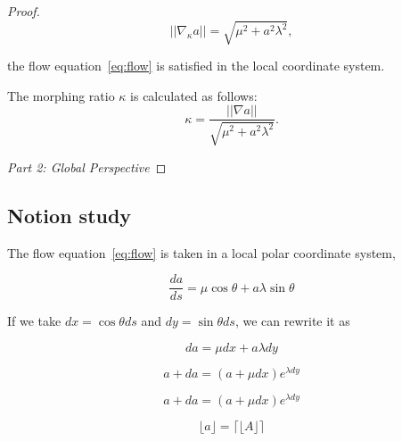 \begin{proof}
    \[ ||\nabla_\kappa a|| = \sqrt{\mu^2 + a^2 \lambda^2}, \]

    the flow equation~\eqref{eq:flow} is satisfied in the local coordinate system.

    The morphing ratio \( \kappa \) is calculated as follows:
    \begin{equation}
        \kappa = \frac{||\nabla a||}{\sqrt{\mu^2 + a^2 \lambda^2}}\label{eq:ratio}.
    \end{equation}

    \emph{Part 2: Global Perspective}



    \qedhere
\end{proof}

\subsection{Notion study}\label{subsec:notion-study}

The flow equation~\eqref{eq:flow} is taken in a local polar coordinate system,

$$\frac{da}{ds} = \mu \cos \theta + a \lambda \sin \theta$$

If we take $dx = \cos \theta ds$ and $dy = \sin \theta ds$, we can rewrite it as

$$da = \mu dx + a \lambda dy$$

$$a + da = (a + \mu dx)e^{\lambda dy}$$

$$a + da = (a + \mu dx)e^{\lambda dy}$$

$$\lfloor a \rfloor = \lceil \lfloor A \rfloor \rceil $$
